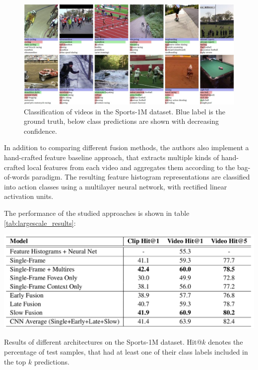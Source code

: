 \begin{figure}[H]
    \centering
    \includegraphics[width=\textwidth]{img_deep/largescale_classification}
    \caption{Classification of videos in the Sports-1M dataset. Blue label is the ground truth, below class predictions are shown with decreasing confidence. \cite{karpathy_large-scale_2014}}
    \label{fig:largescale_classification}
\end{figure}

In addition to comparing different fusion methods, the authors also implement a hand-crafted feature baseline approach, that extracts multiple kinds of hand-crafted local features from each video and aggregates them according to the bag-of-words paradigm.
The resulting feature histogram representations are classified into action classes using a multilayer neural network, with rectified linear activation units.

The performance of the studied approaches is shown in table \ref{tab:largescale_results}:
\begin{table}[H]
    \centering
    \includegraphics{img_deep/largescale_results}
    \caption{Results of different architectures on the Sports-1M dataset. Hit@$k$ denotes the percentage of test samples, that had at least one of their class labels included in the top $k$ predictions. \cite{karpathy_large-scale_2014}}
    \label{tab:largescale_results}
\end{table}

